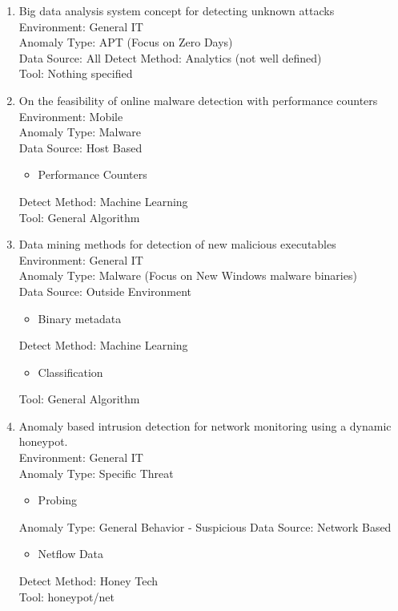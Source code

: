 \documentclass[10pt]{IEEEtran}
\begin{document}
\begin{enumerate}
    \item 
    Big data analysis system concept for detecting unknown attacks\cite{ahn2014big}\\
    Environment: General IT \\
    Anomaly Type: APT (Focus on Zero Days) \\
    Data Source: All
    Detect Method: Analytics (not well defined)\\ 
    Tool: Nothing specified
    
    \item 
    On the feasibility of online malware detection with performance counters\cite{demme2013feasibility}\\
    Environment: Mobile\\
    Anomaly Type: Malware \\
    Data Source: Host Based
    \begin{itemize}
        \item Performance Counters
    \end{itemize}
    Detect Method: Machine Learning\\ 
    Tool: General Algorithm
    
    \item 
    Data mining methods for detection of new malicious executables\cite{schultz2001data}\\
    Environment: General IT\\
    Anomaly Type: Malware (Focus on New Windows malware binaries)\\
    Data Source: Outside Environment
    \begin{itemize}
        \item Binary metadata
    \end{itemize}
    Detect Method: Machine Learning
    \begin{itemize}
        \item Classification
    \end{itemize}
    Tool: General Algorithm
    
    \item 
    Anomaly based intrusion detection for network monitoring using a dynamic honeypot.\cite{hieb2004anomaly}\\
    Environment: General IT\\
    Anomaly Type: Specific Threat
    \begin{itemize}
        \item Probing
    \end{itemize}
    Anomaly Type: General Behavior - Suspicious
    Data Source: Network Based
    \begin{itemize}
        \item Netflow Data
    \end{itemize}
    Detect Method: Honey Tech\\ 
    Tool: honeypot/net 
    

\end{enumerate}
\end{document}
